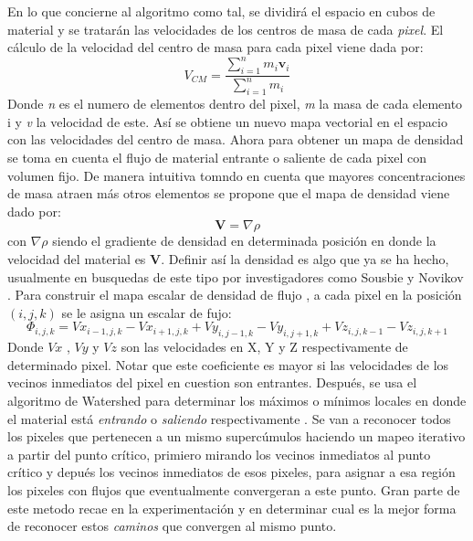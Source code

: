 \documentclass[12pt]{article}
\begin{document}
En lo que concierne al algoritmo como tal, se dividirá el espacio en cubos de material y se tratarán las velocidades de los centros de masa de cada \textit{pixel}. El cálculo de la velocidad del centro de masa para cada pixel viene dada por:
\begin{equation}
V_{CM}=\frac{\sum_{i=1}^n m_i \textbf{v}_i}{\sum_{i=1}^n m_i} 
\end{equation}
Donde \textit{n} es el numero de elementos dentro del pixel, \textit{m} la masa de cada elemento i y \textit{v} la velocidad de este.
Así se obtiene un nuevo mapa vectorial en el espacio con las velocidades del centro de masa. Ahora para obtener un mapa de densidad se toma en cuenta el flujo de material entrante o saliente de cada pixel con volumen fijo. De manera intuitiva tomndo en cuenta que mayores concentraciones de masa atraen más otros elementos se propone que el mapa de densidad viene dado por:
\begin{equation}
\textbf{V}=\nabla \rho
\end{equation}
con $\nabla \rho$ siendo el gradiente de densidad en determinada posición en donde la velocidad del material es \textbf{V}.  Definir así la densidad es algo que ya se ha hecho, usualmente en busquedas de este tipo por investigadores como Sousbie \cite{FullyConn} y Novikov \cite{probe2d}. Para construir el mapa escalar de densidad de flujo , a cada pixel en la posición $(i,j,k)$ se le asigna un escalar de fujo:
\begin{equation}
\Phi_{i,j,k}=Vx_{i-1,j,k}-Vx_{i+1,j,k}+Vy_{i,j-1,k}-Vy_{i,j+1,k}+Vz_{i,j,k-1}-Vz_{i,j,k+1}
\end{equation}
Donde $Vx$ , $Vy$ y $Vz$ son las velocidades en X, Y y Z respectivamente de determinado pixel. Notar que este coeficiente  es mayor si las velocidades de los vecinos inmediatos del pixel en cuestion son entrantes. Después, se usa el algoritmo de Watershed \cite{WaterBeuch} \cite{SegmBeuch} para determinar los máximos o mínimos locales en donde el material está \textit{entrando} o \textit{saliendo} respectivamente . Se van a reconocer todos los pixeles que pertenecen a un mismo supercúmulos haciendo un mapeo iterativo a partir del punto crítico, primiero mirando los vecinos inmediatos al punto crítico y depués los vecinos inmediatos de esos pixeles, para asignar a esa región los pixeles con flujos que eventualmente convergeran a este punto. Gran parte de este metodo recae en la experimentación y en determinar cual es la mejor forma de reconocer estos \textit{caminos} que convergen al mismo punto.
\end{document}
